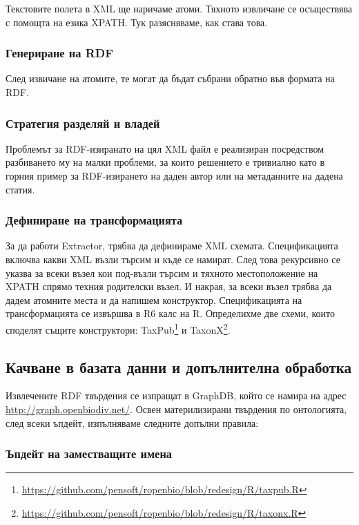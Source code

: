 Текстовите полета в XML ще наричаме атоми. Тяхното извличане се осъществява с помощта на езика XPATH. Тук разясняваме, как става това.

\subsubsection{Генериране на RDF}

След извичане на атомите, те могат да бъдат събрани обратно във формата на RDF. 

\subsubsection{Стратегия разделяй и владей}

Проблемът за RDF-изиранато на цял XML файл е реализиран посредством разбиването му на малки проблеми, за които решението е тривиално като в горния пример за RDF-изирането на даден автор или на метаданните на дадена статия.

\subsubsection{Дефиниране на трансформацията}

За да работи Extractor, трябва да дефинираме XML схемата. Спецификацията включва какви XML възли търсим и къде се намират. След това рекурсивно се указва за всеки възел кои под-възли търсим и тяхното местоположение на XPATH спрямо техния родителски възел. И накрая, за всеки възел трябва да дадем атомните места и да напишем конструктор. Спецификацията на трансформацията се извършва в R6 калс на R. Определихме две схеми, които споделят същите конструктори: TaxPub\footnote{\url{https://github.com/pensoft/ropenbio/blob/redesign/R/taxpub.R}} и TaxonX\footnote{\url{https://github.com/pensoft/ropenbio/blob/redesign/R/taxonx.R}}.

\subsection{Качване в базата данни и допълнителна обработка}

Извлечените RDF твърдения се изпращат в GraphDB, който се намира на адрес \url{http://graph.openbiodiv.net/}. Освен материлизирани твърдения по онтологията, след всеки ъпдейт, изпълняваме следните допълни правила: 

\subsubsection{Ъпдейт на заместващите имена}

